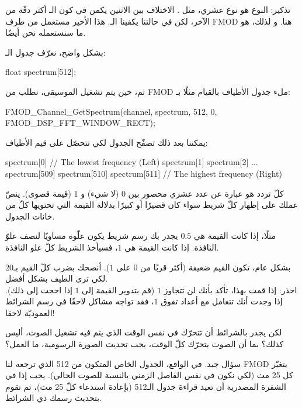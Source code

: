 \begin{information}
تذكير: النوع
هو نوع عشري، مثل
.
الاختلاف بين الاثنين يكمن في كون الـ
أكثر دقّة من الآخر، لكن في حالتنا يكفينا الـ.
هذا الأخير مستعمل من طرف
\textenglish{FMOD}
هنا. و لذلك، هو ما سنستعمله نحن أيضًا.
\end{information}

بشكل واضح، نعرّف جدول الـ:

\begin{Csource}
float spectrum[512];
\end{Csource}

ثم، حين يتم تشغيل الموسيقى، نطلب من 
\textenglish{FMOD}
ملء جدول الأطياف بالقيام مثلًا بـ:

\begin{Csource}
FMOD_Channel_GetSpectrum(channel, spectrum, 512, 0, FMOD_DSP_FFT_WINDOW_RECT);
\end{Csource}

يمكننا بعد ذلك تصفّح الجدول لكي نتحصّل على قيم الأطياف:

\begin{Csource}
spectrum[0] // The lowest frequency (Left)
spectrum[1]
spectrum[2]
...
spectrum[509]
spectrum[510]
spectrum[511] // The highest frequency (Right)
\end{Csource}

كلّ تردد هو عبارة عن عدد عشري محصور بين $ 0 $ (لا شيء) و $ 1 $ (قيمة قصوى). ينصّ عملك على إظهار كلّ شريط سواء كان قصيرًا أو كبيرًا بدلالة القيمة التي تحتويها كلّ من خانات الجدول.

مثلًا، إذا كانت القيمة هي $ 0.5 $ يجدر بك رسم شريط يكون علّوه مساويًا لنصف علوّ النافذة. إذا كانت القيمة هي $ 1 $، فسيأخذ الشريط كلّ علو النافذة.

بشكل عام، تكون القيم ضعيفة (أكثر قربًا من $ 0 $ على $ 1 $). أنصحك بضرب كلّ القيم بـ20 لكي ترى الطيف بشكل أفضل.\\
احذر: إذا قمت بهذا، تأكد بأنك لن تتجاوز $ 1 $ (قم بتدوير القيمة إلى $ 1 $ إذا احجت إلى ذلك). إذا وجدت أنك تتعامل مع أعداد تفوق $ 1 $، فقد تواجه مشاكل لاحقًا في رسم الشرائط العموديّة لاحقا!

\begin{question}
لكن يجدر بالشرائط أن تتحرّك في نفس الوقت الذي يتم فيه تشغيل الصوت، أليس كذلك؟ بما أن الصوت يتحرّك كلّ الوقت، يجب تحديث الصورة الرسومية، ما العمل؟
\end{question}

سؤال جيد. في الواقع، الجدول الخاص المتكون من 
512 
الذي ترجعه لنا
\textenglish{FMOD}
يتغيّر كل 25 مث (لكي نكون في نفس الفاصل الزمني بالنسبة للصوت الحالي). يجب إذا في الشفرة المصدرية أن تعيد قراءة جدول الـ512
 (بإعادة استدعاء
 كلّ 25 مث)، ثم تقوم بتحديث رسمك ذي الشرائط.
 
